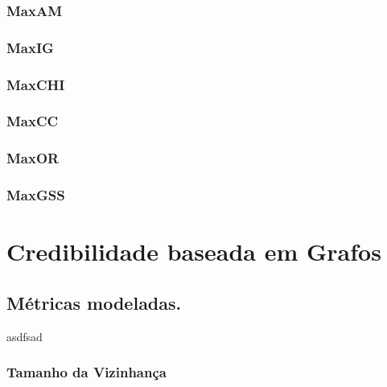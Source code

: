 \subsubsection{MaxAM}
\label{subsubsection::maxam}

\subsubsection{MaxIG}
\label{subsubsection::maxig}

\subsubsection{MaxCHI}
\label{subsubsection::maxchi}

\subsubsection{MaxCC}
\label{subsubsection::maxcc}

\subsubsection{MaxOR}
\label{subsubsection::maxor}

\subsubsection{MaxGSS}
\label{subsubsection::maxgss}


\section{Credibilidade baseada em Grafos}
\label{sec::pg_cred_baseada_grafos}

\subsection{Métricas modeladas.}
\label{subsec::pg_metricas_grafos}

asdfsad


\subsubsection{Tamanho da Vizinhança}
\label{subsubsection::neighborhoodsize}

